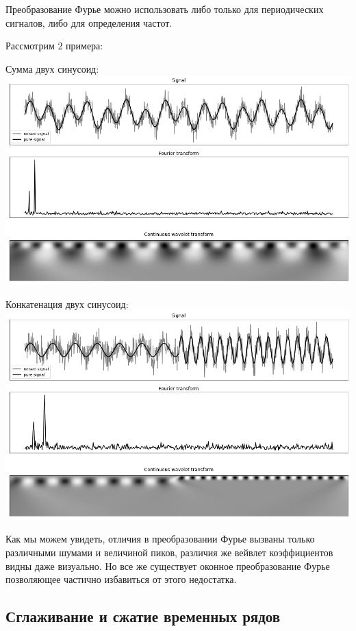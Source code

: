 \documentclass[a4paper]{article}
\begin{document}
	Преобразование Фурье можно использовать либо только для периодических сигналов, либо для определения частот.
	
	Рассмотрим 2 примера:
	\begin{center}
		Сумма двух синусоид:
		\includegraphics[scale=0.45]{./output_2_0.png}
	\end{center}
	\begin{center}
		Конкатенация двух синусоид:
		\includegraphics[scale=0.45]{./output_3_0.png}
	\end{center}

	Как мы можем увидеть, отличия в преобразовании Фурье вызваны только различными шумами и величиной пиков, различия же вейвлет коэффициентов видны даже визуально. Но все же существует оконное преобразование Фурье позволяющее частично избавиться от этого недостатка.
		
	\subsection{Сглаживание и сжатие временных рядов}
	
\end{document}
